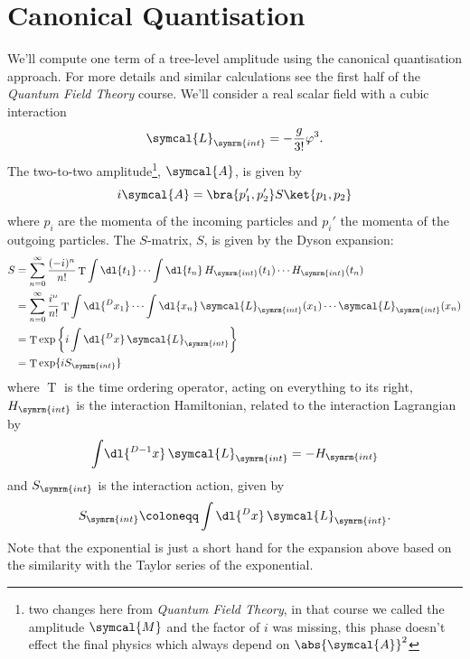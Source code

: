 \documentclass[fleqn]{NotesClass}
\newcommand*{\course}[1]{\textit{#1}}
\newcommand{\lagrangianDensity}{\symcal{L}}
\newcommand{\amplitude}{\symcal{A}}
\newcommand{\interaction}{{\symrm{int}}}
\DeclareMathOperator{\timeOrdering}{T}
\begin{document}
    \section{Canonical Quantisation}
    We'll compute one term of a tree-level amplitude using the canonical quantisation approach.
    For more details and similar calculations see the first half of the \course{Quantum Field Theory} course.
    We'll consider a real scalar field with a cubic interaction
    \begin{equation}
        \lagrangianDensity_{\interaction} = -\frac{g}{3!}\varphi^3.
    \end{equation}
    The two-to-two amplitude\footnote{two changes here from \course{Quantum Field Theory}, in that course we called the amplitude \(\symcal{M}\) and the factor of \(i\) was missing, this phase doesn't effect the final physics which always depend on \(\abs{\amplitude}^2\)}, \(\amplitude\), is given by
    \begin{equation}
        i\amplitude  = \bra{p_1', p_2'} S \ket{p_1, p_2}
    \end{equation}
    where \(p_i\) are the momenta of the incoming particles and \(p_i'\) the momenta of the outgoing particles.
    The \(S\)-matrix, \(S\), is given by the Dyson expansion:
    \begin{align}
        S &= \sum_{n = 0}^{\infty} \frac{(-i)^n}{n!} \timeOrdering \int \dl{t_1} \dotsm \int \dl{t_n} \, H_{\interaction}(t_1) \dotsm H_{\interaction}(t_n)\\
        &= \sum_{n = 0}^{\infty} \frac{i^n}{n!} \timeOrdering \int \dl{^Dx_1} \dotsm \int \dl{x_n} \, \lagrangianDensity_{\interaction}(x_1) \dotsm \lagrangianDensity_{\interaction}(x_n)\\
        &= \timeOrdering \exp\left\{ i \int \dl{^Dx} \, \lagrangianDensity_{\interaction} \right\}\\
        &= \timeOrdering \exp\{ i S_{\interaction} \}
    \end{align}
    where \(\timeOrdering\) is the time ordering operator, acting on everything to its right, \(H_{\interaction}\) is the interaction Hamiltonian, related to the interaction Lagrangian by
    \begin{equation}
        \int \! \dl{^{D-1}x} \, \lagrangianDensity_{\interaction} = -H_{\interaction}
    \end{equation}
    and \(S_{\interaction}\) is the interaction action, given by
    \begin{equation}
        S_{\interaction} \coloneqq \int \dl{^Dx} \, \lagrangianDensity_{\interaction}.
    \end{equation}
    Note that the exponential is just a short hand for the expansion above based on the similarity with the Taylor series of the exponential.
    
\end{document}
